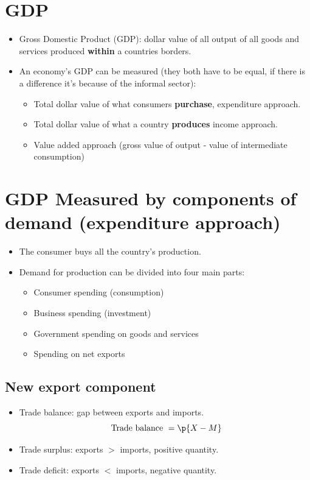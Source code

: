 \documentclass[openany]{book}
\begin{document}
\section{GDP}
\begin{itemize}
    \item Gross Domestic Product (GDP): dollar value of all output of all goods and services produced \textbf{within} a countries borders. 
    \item An economy's GDP can be measured (they both have to be equal, if there is a difference it's because of the informal sector): 
        \begin{itemize}
            \item Total dollar value of what consumers \textbf{purchase}, expenditure approach.
            \item Total dollar value of what a country \textbf{produces} income approach.
            \item Value added approach (gross value of output - value of intermediate consumption)
        \end{itemize}
\end{itemize}

\section{GDP Measured by components of demand (expenditure approach)}
\begin{itemize}
    \item The consumer buys all the country's production.
    \item Demand for production can be divided into four main parts: 
        \begin{itemize}
            \item Consumer spending (consumption)
            \item Business spending (investment)
            \item Government spending on goods and services
            \item Spending on net exports 
        \end{itemize}
\end{itemize}

\subsection{New export component}
\begin{itemize}
    \item Trade balance: gap between exports and imports.
        \[
            \text{ Trade balance } = \p{X - M} 
        \]
    \item Trade surplus: exports $>$ imports, positive quantity. 
    \item Trade deficit: exports $<$ imports, negative quantity. 
\end{itemize}
\end{document}

